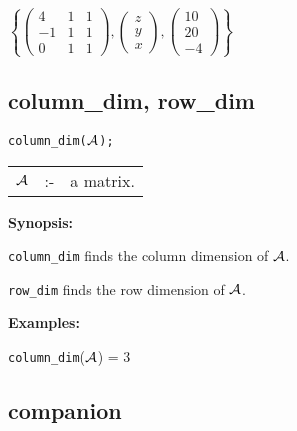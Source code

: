 \vspace*{0.1in}

\begin{flushleft}
\hspace*{0.175in}
\begin{math}  
\left\{ \left( \begin{array}{ccc} 4 & 1 & 1 \\ -1 & 1 & 1 \\ 0 & 1 & 1 
\end{array} \right), \left( \begin{array}{c} z \\ y \\ x \end{array} 
\right), \left( \begin{array}{c} 10 \\ 20 \\ -4 
\end{array} \right) \right\} 
\end{math}  
\end{flushleft}

\subsection{column\_dim, row\_dim}


\hspace*{0.175in} {\tt column\_dim(${\cal A}$);}

\hspace*{0.1in} 
\begin{tabular}{l l l}
${\cal A}$ &:-& a matrix.
\end{tabular}

{\bf Synopsis:} %

\hspace*{0.175in} {\tt column\_dim} finds the column dimension of 
                ${\cal A}$. 

\hspace*{0.175in} {\tt row\_dim} finds the row dimension of ${\cal A}$.

{\bf Examples:}

\hspace*{0.175in}
{\tt column\_dim}(${\cal A}$) = 3

\subsection{companion}

